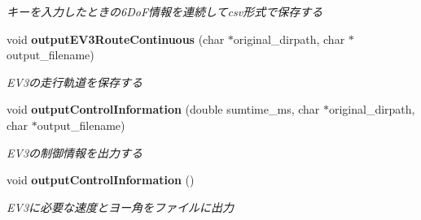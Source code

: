 \begin{DoxyCompactItemize}
\begin{DoxyCompactList}\small\item\em キーを入力したときの6\-Do\-F情報を連続してcsv形式で保存する \end{DoxyCompactList}\item 
void {\bf output\-E\-V3\-Route\-Continuous} (char $\ast$original\-\_\-dirpath, char $\ast$output\-\_\-filename)
\begin{DoxyCompactList}\small\item\em E\-V3の走行軌道を保存する \end{DoxyCompactList}\item 
void {\bf output\-Control\-Information} (double sumtime\-\_\-ms, char $\ast$original\-\_\-dirpath, char $\ast$output\-\_\-filename)
\begin{DoxyCompactList}\small\item\em E\-V3の制御情報を出力する \end{DoxyCompactList}\item 
void {\bf output\-Control\-Information} ()
\begin{DoxyCompactList}\small\item\em E\-V3に必要な速度とヨー角をファイルに出力 \end{DoxyCompactList}\end{DoxyCompactItemize}
